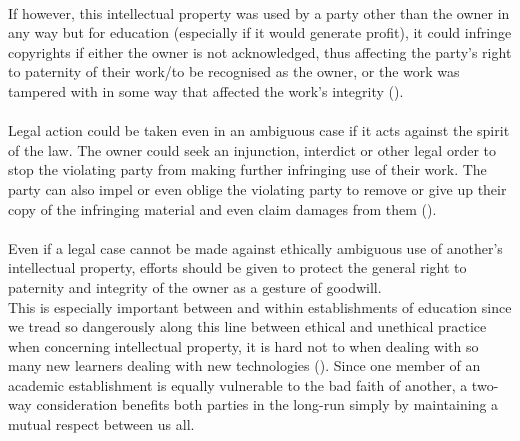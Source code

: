 \\If however, this intellectual property was used by a party other than the owner in any way but for education (especially if it would generate profit), it could infringe copyrights if either the owner is not acknowledged, thus affecting the party’s right to paternity of their work/to be recognised as the owner, or the work was tampered with in some way that affected the work’s integrity (\cite{LSEPI in Computer Tech}).
\\\\Legal action could be taken even in an ambiguous case if it acts against the spirit of the law. The owner could seek an injunction, interdict or other legal order to stop the violating party from making further infringing use of their work. The party can also impel or even oblige the violating party to remove or give up their copy of the infringing material and even claim damages from them (\cite{JiscLegal - Intellectual Prop.}).
\\\\Even if a legal case cannot be made against ethically ambiguous use of another's intellectual property, efforts should be given to protect the general right to paternity and integrity of the owner as a gesture of goodwill.
\\This is especially important between and within establishments of education since we tread so dangerously along this line between ethical and unethical practice when concerning intellectual property, it is hard not to when dealing with so many new learners dealing with new technologies (\cite{JiscLegal - Intellectual Prop.}). Since one member of an academic establishment is equally vulnerable to the bad faith of another, a two-way consideration benefits both parties in the long-run simply by maintaining a mutual respect between us all.
